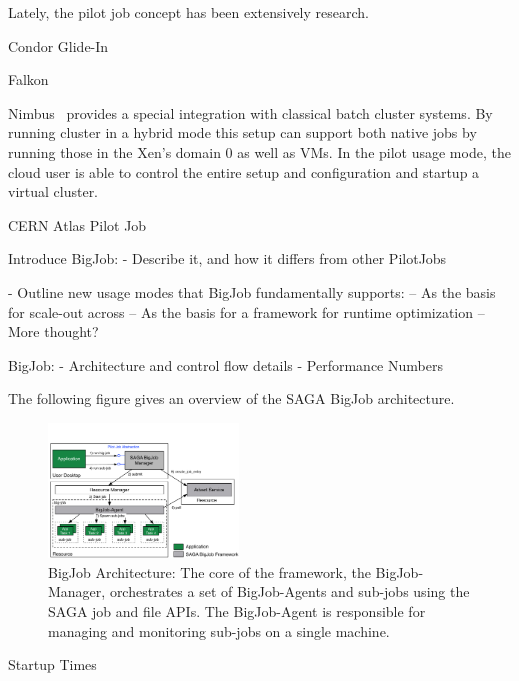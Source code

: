 \documentclass[conference,final]{IEEEtran}
\begin{document}

Lately, the pilot job concept has been extensively research.

Condor Glide-In~\cite{citeulike:291860}

Falkon~\cite{1362680}


Nimbus~\cite{10.1109/MIC.2009.94} provides a special integration with classical batch cluster systems. By running cluster
in a hybrid mode this setup can support both native jobs by running those in the Xen's domain 0 as well
as VMs. In the pilot usage mode, the cloud user is able to control the entire setup and configuration 
and startup a virtual cluster.


CERN Atlas Pilot Job~\cite{1555338}


Introduce BigJob:
 - Describe it, and how it differs from other PilotJobs

 - Outline new usage modes that BigJob fundamentally supports:
    -- As the basis for scale-out across
    -- As the basis for a framework for runtime optimization
    -- More thought?

BigJob:
 - Architecture and control flow details
 - Performance Numbers



The following figure gives an overview of the SAGA BigJob architecture.

\begin{figure}[htbp]
    \centering
    \includegraphics[width=0.45\textwidth]{figures/bigjob}
    \caption{BigJob Architecture: The core of the framework, the BigJob-Manager,
     orchestrates a set of BigJob-Agents and sub-jobs using the SAGA job and file APIs. 
     The BigJob-Agent is responsible for managing and monitoring sub-jobs on a 
     single machine.}
    \label{fig:figures_bigjob}
\end{figure}



Startup Times
\end{document}
